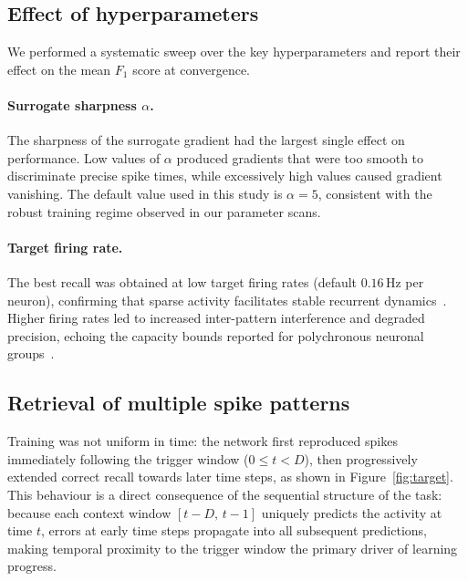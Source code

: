 \documentclass{scrartcl}
\newcommand{\citep}[1]{\parencite{#1}}
\begin{document}
\subsection{Effect of hyperparameters}
We performed a systematic sweep over the key hyperparameters and report their effect on the mean $F_1$ score at convergence.

\paragraph{Surrogate sharpness $\alpha$.}
The sharpness of the surrogate gradient had the largest single effect on performance. Low values of $\alpha$ produced gradients that were too smooth to discriminate precise spike times, while excessively high values caused gradient vanishing. The default value used in this study is $\alpha = 5$, consistent with the robust training regime observed in our parameter scans.

\paragraph{Target firing rate.}
The best recall was obtained at low target firing rates (default $0.16\,\mathrm{Hz}$ per neuron), confirming that sparse activity facilitates stable recurrent dynamics~\citep{Izhikevich2006,Yin2026}. Higher firing rates led to increased inter-pattern interference and degraded precision, echoing the capacity bounds reported for polychronous neuronal groups~\citep{Szatmary2010}.

\subsection{Retrieval of multiple spike patterns}

Training was not uniform in time: the network first reproduced spikes immediately following the trigger window ($0 \leq t < D$), then progressively extended correct recall towards later time steps, as shown in Figure~\ref{fig:target}. This behaviour is a direct consequence of the sequential structure of the task: because each context window $[t-D,\, t-1]$ uniquely predicts the activity at time $t$, errors at early time steps propagate into all subsequent predictions, making temporal proximity to the trigger window the primary driver of learning progress.
\end{document}
